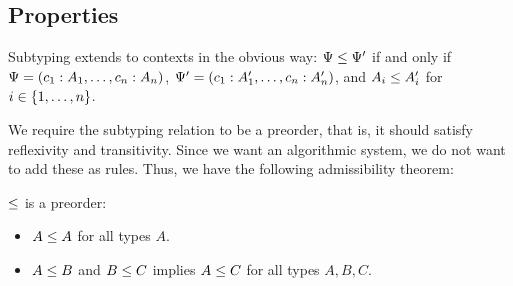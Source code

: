 

\subsection{Properties}

Subtyping extends to contexts in the obvious way: $\Psi \le \Psi'$ if and only if $\Psi = (c_1 : A_1, \ldots, c_n : A_n)$, $\Psi' = (c_1 : A_1', \ldots, c_n : A_n')$, and $A_i \le A_i'$ for $i \in \lbrace1, \ldots, n\rbrace$.

We require the subtyping relation to be a preorder, that is, it should satisfy reflexivity and transitivity. Since we want an algorithmic system, we do not want to add these as rules. Thus, we have the following admissibility theorem:

\begin{theorem}
  \label{sub-is-preorder}
  $\le$ is a preorder:
  \begin{itemize}
    \item $A \le A$ for all types $A$.
    \item $A \le B$ and $B \le C$ implies $A \le C$ for all types $A, B, C$.
  \end{itemize}
\end{theorem}

